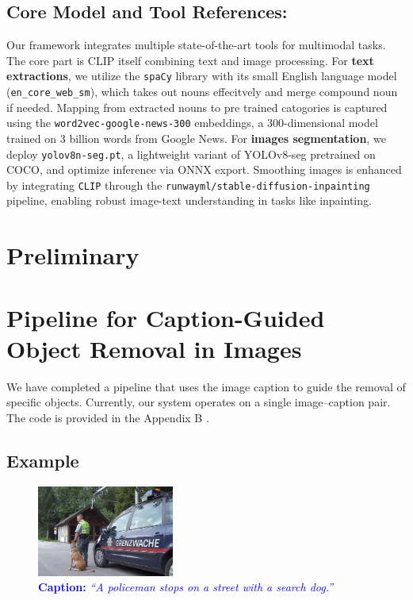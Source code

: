 \documentclass[11pt,letterpaper]{article}
\begin{document}
\subsection{Core Model and Tool References:}
Our framework integrates multiple state-of-the-art tools for multimodal tasks. The core part is CLIP itself combining text and image processing.
For \textbf{text extractions}, we utilize the \texttt{spaCy} library with its small English language model (\texttt{en\_core\_web\_sm}), which takes out nouns effecitvely and merge compound noun if needed. 
Mapping from extracted nouns to pre trained catogories is captured using the \texttt{word2vec-google-news-300} embeddings, a 300-dimensional model trained on 3 billion words from Google News. 
For \textbf{images segmentation}, we deploy \texttt{yolov8n-seg.pt}, a lightweight variant of YOLOv8-seg pretrained on COCO, and optimize inference via ONNX export. Smoothing images is enhanced by integrating \texttt{CLIP} through the \texttt{runwayml/stable-diffusion-inpainting} pipeline, enabling robust image-text understanding in tasks like inpainting.



\section{Preliminary}


\section*{Pipeline for Caption-Guided Object Removal in Images}

We have completed a pipeline that uses the image caption to guide the removal of specific objects. Currently, our system operates on a single image--caption pair. The code is provided in the Appendix B .

\subsection*{Example}
\noindent
   \begin{figure}[h]
    \centering
    \includegraphics[width=0.4\textwidth]{midterm_report/assets/oriIMG.jpg}
    \caption{\textcolor{blue}{\textbf{Caption:} \emph{``A policeman stops on a street with a search dog.''}}}
    \label{fig:original_image}
\end{figure}
\end{document}
